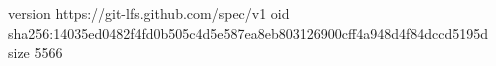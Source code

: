 version https://git-lfs.github.com/spec/v1
oid sha256:14035ed0482f4fd0b505c4d5e587ea8eb803126900cff4a948d4f84dccd5195d
size 5566
